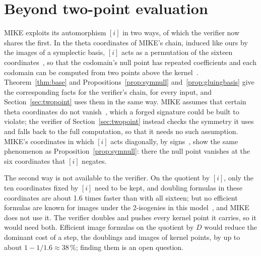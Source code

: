 \documentclass[version=preprint]{iacrcc}
\begin{document}
    \section{Beyond two-point evaluation}
    \label{app:beyond}

    MIKE exploits its automorphism $[i]$ in two ways, of which the verifier
    now shares the first. In the theta coordinates of MIKE's chain, induced
    like ours by the images of a symplectic basis, $[i]$ acts as a permutation
    of the sixteen coordinates~\cite[Corollary G.3]{BDD+26}, so that the
    codomain's null point has repeated coefficients and each codomain can be
    computed from two points above the kernel~\cite[Theorem E.1]{BDD+26}.
    Theorem~\ref{thm:base} and Propositions~\ref{prop:symnull}
    and~\ref{prop:gluingbasis} give the corresponding facts for the
    verifier's chain, for every input, and Section~\ref{sec:twopoint} uses them
    in the same way. MIKE assumes that certain theta coordinates do not
    vanish~\cite[Heuristic E.1]{BDD+26}, which a forged signature could be
    built to violate; the verifier of Section~\ref{sec:twopoint} instead checks
    the symmetry it uses and falls back to the full computation, so that it
    needs no such assumption. MIKE's coordinates in which $[i]$ acts diagonally,
    by signs~\cite[Definition G.1 and Proposition G.3]{BDD+26}, show the same
    phenomenon as Proposition~\ref{prop:symnull}: there the null point vanishes
    at the six coordinates that $[i]$ negates.

    The second way is not available to the verifier. On the quotient by $[i]$,
    only the ten coordinates fixed by $[i]$ need to be kept, and doubling
    formulas in these coordinates are about 1.6 times faster than with all
    sixteen; but no efficient formulas are known for images under the
    2-isogenies in this model~\cite[Remark E.2]{BDD+26}, and MIKE does not use
    it. The verifier doubles and pushes every kernel point it carries, so it
    would need both. Efficient image formulas on the quotient by $D$ would
    reduce the dominant cost of a step, the doublings and images of kernel
    points, by up to about $1 - 1/1.6 \approx 38\,\%$; finding them is an open
    question.
\end{document}
